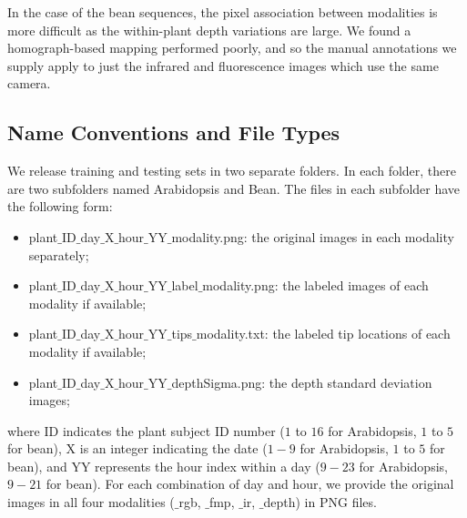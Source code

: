 In the case of the bean sequences, the pixel association between modalities is more difficult as the within-plant depth variations are large.  
We found a homograph-based mapping performed poorly, and so the manual annotations we supply apply to just the infrared and fluorescence images which use the same camera.


\subsection{Name Conventions and File Types}
We release training and testing sets in two separate folders.
In each folder, there are two subfolders named Arabidopsis and Bean.
The files in each subfolder have the following form:

\begin{itemize}
\item plant$\_$ID$\_$day$\_$X$\_$hour$\_$YY$\_$modality.png: the original images in each modality separately;
\item plant$\_$ID$\_$day$\_$X$\_$hour$\_$YY$\_$label$\_$modality.png: the labeled images of each modality if available;
\item plant$\_$ID$\_$day$\_$X$\_$hour$\_$YY$\_$tips$\_$modality.txt: the labeled tip locations of each modality if available;
\item plant$\_$ID$\_$day$\_$X$\_$hour$\_$YY$\_$depthSigma.png: the depth standard deviation images;
\end{itemize}
where ID indicates the plant subject ID number ($1$ to $16$ for Arabidopsis, $1$ to $5$ for bean), X is an integer indicating the date ($1-9$ for Arabidopsis, $1$ to $5$ for bean), and YY represents the hour index within a day ($9-23$ for Arabidopsis, $9-21$ for bean).
For each combination of day and hour, we provide the original images in all four modalities ($\_$rgb, $\_$fmp, $\_$ir, $\_$depth) in PNG files.
